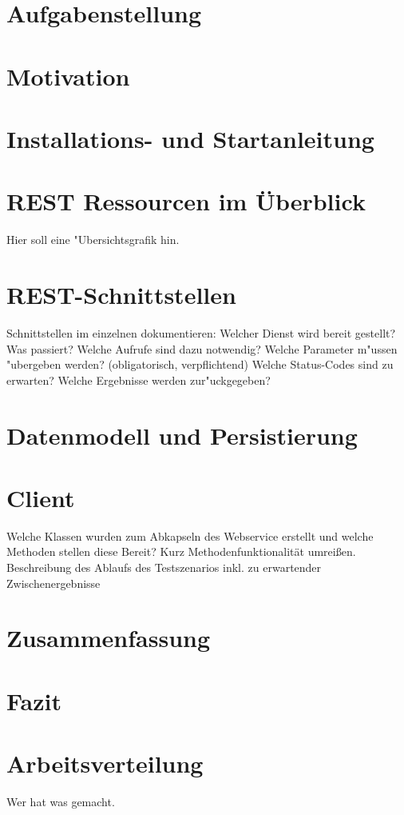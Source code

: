 \documentclass[150]{HSMW-Thesis}
\begin{document}
\begin{Vorwort}
\end{Vorwort}

\Hauptteil

\chapter{Aufgabenstellung}
\chapter{Motivation}
\chapter{Installations- und Startanleitung}
\chapter{REST Ressourcen im Überblick}
Hier soll eine "Ubersichtsgrafik hin.
\chapter{REST-Schnittstellen}
 Schnittstellen im einzelnen dokumentieren:
 Welcher Dienst wird bereit gestellt? Was passiert?
 Welche Aufrufe sind dazu notwendig?
 Welche Parameter m"ussen "ubergeben werden? (obligatorisch, verpflichtend)
 Welche Status-Codes sind zu erwarten?
 Welche Ergebnisse werden zur"uckgegeben? 
\chapter{Datenmodell und Persistierung}
\chapter{Client}
Welche Klassen wurden zum Abkapseln des Webservice erstellt und welche Methoden
stellen diese Bereit? Kurz Methodenfunktionalität umreißen.
Beschreibung des Ablaufs des Testszenarios inkl. zu erwartender Zwischenergebnisse
\chapter{Zusammenfassung}
\chapter{Fazit}
\chapter{Arbeitsverteilung}
Wer hat was gemacht.

\Anhang


\begin{thebibliography}{99}
\bibitem{} 
\end{thebibliography}
\end{document}
